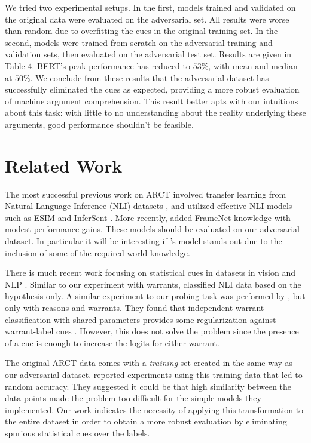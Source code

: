 \documentclass[11pt,a4paper]{article}
\begin{document}
We tried two experimental setups. In the first, models trained and validated on the original data were evaluated on the adversarial set. All results were worse than random due to overfitting the cues in the original training set. In the second, models were trained from scratch on the adversarial training and validation sets, then evaluated on the adversarial test set. Results are given in Table 4. BERT's peak performance has reduced to $53\%$, with mean and median at $50\%$. We conclude from these results that the adversarial dataset has successfully eliminated the cues as expected, providing a more robust evaluation of machine argument comprehension. This result better apts with our intuitions about this task: with little to no understanding about the reality underlying these arguments, good performance shouldn't be feasible.

\section{Related Work}

The most successful previous work on ARCT \cite{ChoiL18, ZhaoLLZY18, NivenK18} involved transfer learning from Natural Language Inference (NLI) datasets \cite{BowmanAPM15, WilliamsNB17}, and utilized effective NLI models such as ESIM \cite{ChenZLWJ16} and InferSent \cite{ConneauKSBB17}. More recently, \citeauthor{BotschenSG18}  added FrameNet knowledge with modest performance gains. These models should be evaluated on our adversarial dataset. In particular it will be interesting if \citeauthor{BotschenSG18}'s model stands out due to the inclusion of some of the required world knowledge.

There is much recent work focusing on statistical cues in datasets in vision \cite{JoB17} and NLP \cite{SanchezMR18, McCoyPL19, GururanganSLSBS18, GlocknerSG18, PoliakNHRD18, RajpurkarJL18, JiaL17}. Similar to our experiment with warrants, \citeauthor{PoliakNHRD18}  classified NLI data based on the hypothesis only. A similar experiment to our probing task was performed by \citeauthor{NivenK18} , but only with reasons and warrants. They found that independent warrant classification with shared parameters provides some regularization against warrant-label cues \cite{NivenK18}. However, this does not solve the problem since the presence of a cue is enough to increase the logits for either warrant.

The original ARCT data comes with a \textit{training} set created in the same way as our adversarial dataset. \citeauthor{HabernalWGS17}  reported experiments using this training data that led to random accuracy. They suggested it could be that high similarity between the data points made the problem too difficult for the simple models they implemented. Our work indicates the necessity of applying this transformation to the entire dataset in order to obtain a more robust evaluation by eliminating spurious statistical cues over the labels.
\end{document}
